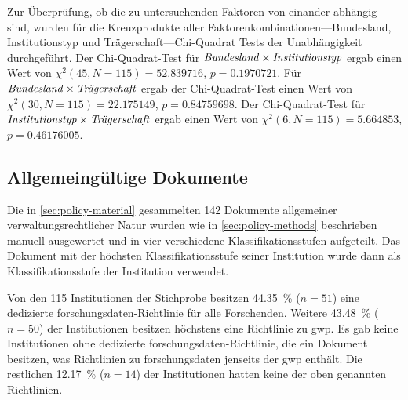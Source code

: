 Zur Überprüfung, ob die zu untersuchenden Faktoren von einander abhängig sind, wurden für die Kreuzprodukte aller Faktorenkombinationen---Bundesland, Institutionstyp und Trägerschaft---Chi-Quadrat Tests der Unabhängigkeit durchgeführt.
Der Chi-Quadrat-Test für $\text{\textit{Bundesland}}\times\text{\textit{Institutionstyp}}$ ergab einen Wert von $\chi^2 (\num{45}, N = \num{115}) = \num[round-mode=places,round-precision=3]{52,839716}$, $p = \num[round-mode=places,round-precision=3]{0,1970721}$.
Für $\text{\textit{Bundesland}}\times\text{\textit{Trägerschaft}}$ ergab der Chi-Quadrat-Test einen Wert von $\chi^2 (\num{30}, N = \num{115}) = \num[round-mode=places,round-precision=3]{22,175149}$, $p = \num[round-mode=places,round-precision=3]{0,84759698}$.
Der Chi-Quadrat-Test für $\text{\textit{Institutionstyp}}\times\text{\textit{Trägerschaft}}$ ergab einen Wert von $\chi^2 (\num{6}, N = \num{115}) = \num[round-mode=places,round-precision=3]{5,664853}$, $p = \num[round-mode=places,round-precision=3]{0,46176005}$.


\subsection{Allgemeingültige Dokumente}\label{sec:policy-results-general}
Die in \cref{sec:policy-material} gesammelten \num{142} Dokumente allgemeiner verwaltungsrechtlicher Natur wurden wie in \cref{sec:policy-methods} beschrieben manuell ausgewertet und in vier verschiedene Klassifikationsstufen aufgeteilt.
Das Dokument mit der höchsten Klassifikationsstufe seiner Institution wurde dann als Klassifikationsstufe der Institution verwendet.

Von den \num{115} Institutionen der Stichprobe besitzen \SI{44,35}{\percent} ($n=\num{51}$) eine dedizierte \gls{forschungsdaten}-Richtlinie für alle Forschenden.
Weitere \SI{43,48}{\percent} ($n=\num{50}$) der Institutionen besitzen höchstens eine Richtlinie zu \gls{gwp}.
Es gab keine Institutionen ohne dedizierte \gls{forschungsdaten}-Richtlinie, die ein Dokument besitzen, was Richtlinien zu \gls{forschungsdaten} jenseits der \gls{gwp} enthält.
Die restlichen \SI{12,17}{\percent} ($n=\num{14}$) der Institutionen hatten keine der oben genannten Richtlinien.

